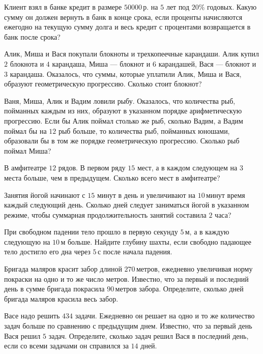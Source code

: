 \begin{class}[number=1]
\begin{listofex}
		\item Клиент взял в банке кредит в размере \( 50 000 \) р. на \( 5 \) лет под \( 20\% \) годовых. Какую сумму он должен вернуть в банк в конце срока, если проценты начисляются ежегодно на текущую сумму долга и весь кредит с процентами возвращается в банк после срока?
		\item Алик, Миша и Вася покупали блокноты и трехкопеечные карандаши. Алик купил \( 2 \) блокнота и \( 4 \) карандаша, Миша --- блокнот и \( 6 \) карандашей, Вася --- блокнот и \( 3 \) карандаша. Оказалось, что суммы, которые уплатили Алик, Миша и Вася, образуют геометрическую прогрессию. Сколько стоит блокнот?
		\item Ваня, Миша, Алик и Вадим ловили рыбу. Оказалось, что количества рыб, пойманных каждым из них, образуют в указанном порядке арифметическую прогрессию. Если бы Алик поймал столько же рыб, сколько Вадим, а Вадим поймал бы на \( 12 \) рыб больше, то количества рыб, пойманных юношами, образовали бы в том же порядке геометрическую прогрессию. Сколько рыб поймал Миша?
		\item В амфитеатре \( 12 \) рядов. В первом ряду \( 15 \) мест, а в каждом следующем на \( 3 \) места больше, чем в предыдущем. Сколько всего мест в амфитеатре?
		\item Занятия йогой начинают с \( 15 \) минут в день и увеличивают на \( 10 \) минут время каждый следующий день. Сколько дней следует заниматься йогой в указанном режиме, чтобы суммарная продолжительность занятий составила \( 2 \) часа?
		\item При свободном падении тело прошло в первую секунду \( 5 \) м, а в каждую следующую на \( 10 \) м больше. Найдите глубину шахты, если свободно падающее тело достигло его дна через \( 5 \) с после начала падения.
		\item Бригада маляров красит забор длиной \( 270 \) метров, ежедневно увеличивая норму покраски на одно и то же число метров. Известно, что за первый и последний день в сумме бригада покрасила \( 90 \) метров забора. Определите, сколько дней бригада маляров красила весь забор.
		\item Васе надо решить \( 434 \) задачи. Ежедневно он решает на одно и то же количество задач больше по сравнению с предыдущим днем. Известно, что за первый день Вася решил \( 5 \) задач. Определите, сколько задач решил Вася в последний день, если со всеми задачами он справился за \( 14 \) дней.
	\end{listofex}
\end{class}

